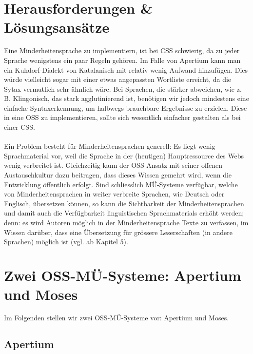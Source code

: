 \documentclass[11pt,twoside]{mparticle}
\begin{document}
\section{Herausforderungen \& Lösungsansätze}
\label{herausforderungen}
Eine Minderheitensprache zu implementiern, ist bei CSS schwierig, da
zu jeder Sprache wenigstens ein paar Regeln gehören. Im Falle von
Apertium kann man ein Kuhdorf-Dialekt von Katalanisch mit relativ
wenig Aufwand hinzufügen. Dies würde vielleicht sogar mit einer etwas
angepassten Wortliste erreicht, da die Sytax vermutlich sehr
ähnlich wäre. Bei Sprachen, die stärker abweichen, wie z. B. Klingonisch,
das stark agglutinierend ist, benötigen wir jedoch mindestens eine einfache 
Syntaxerkennung, um halbwegs brauchbare Ergebnisse zu erzielen. Diese in eine OSS zu
implementieren, sollte sich wesentlich einfacher gestalten als bei
einer CSS.
\\
\\
Ein Problem besteht für Minderheitensprachen generell: Es liegt wenig Sprachmaterial vor, weil die Sprache
in der (heutigen) Hauptressource des Webs wenig verbreitet ist. Gleichzeitig kann der OSS-Ansatz mit seiner
offenen Austauschkultur dazu beitragen, dass dieses Wissen gemehrt wird, wenn die Entwicklung öffentlich
erfolgt. Sind schliesslich MÜ-Systeme verfügbar, welche von Minderheitensprachen in weiter verbreite
Sprachen, wie Deutsch oder Englisch, übersetzen können, so kann die Sichtbarkeit der Minderheitensprachen
und damit auch die Verfügbarkeit linguistischen Sprachmaterials erhöht werden; denn: es wird Autoren möglich in der
Minderheitensprache Texte zu verfassen, im Wissen darüber, dass eine Übersetzung für grössere Leserschaften (in
andere Sprachen) möglich ist (vgl. \cite{forcada} ab Kapitel 5).

\section{Zwei OSS-MÜ-Systeme: Apertium und Moses}
\label{apertiumMoses}
Im Folgenden stellen wir zwei OSS-MÜ-Systeme vor: Apertium und Moses.

\subsection{Apertium}
\label{apertium}
\end{document}
